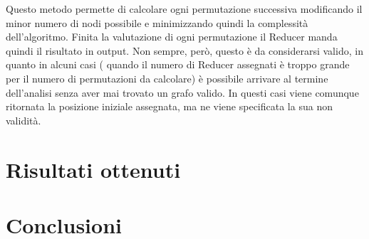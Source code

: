 \documentclass[]{IEEEtran}
\begin{document}
Questo metodo permette di calcolare ogni permutazione successiva modificando il minor numero di nodi possibile e minimizzando quindi la complessità dell'algoritmo.
Finita la valutazione di ogni permutazione il Reducer manda quindi il risultato in output.
Non sempre, però, questo è da considerarsi valido, in quanto in alcuni casi ( quando il numero di Reducer assegnati è troppo grande per il numero di permutazioni da calcolare) è possibile arrivare al termine dell'analisi senza aver mai trovato un grafo valido. In questi casi viene comunque ritornata la posizione iniziale assegnata, ma ne viene specificata la sua non validità.

\section{Risultati ottenuti}
\section{Conclusioni}



\end{document}
